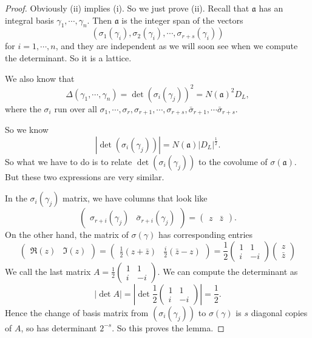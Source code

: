 \documentclass[a4paper]{article}
\begin{document}
\begin{proof}
  Obviously (ii) implies (i). So we just prove (ii). Recall that $\mathfrak{a}$ has an integral basis $\gamma_1, \cdots, \gamma_n$. Then $\mathfrak{a}$ is the integer span of the vectors
  \[
    (\sigma_1(\gamma_i), \sigma_2(\gamma_i), \cdots, \sigma_{r + s}(\gamma_i))
  \]
  for $i = 1, \cdots, n$, and they are independent as we will soon see when we compute the determinant. So it is a lattice.

  We also know that
  \[
    \Delta(\gamma_1, \cdots, \gamma_n) = \det (\sigma_i(\gamma_j))^2 = N(\mathfrak{a})^2 D_L,
  \]
  where the $\sigma_i$ run over all $\sigma_1, \cdots, \sigma_r, \sigma_{r + 1}, \cdots, \sigma_{r + s}, \bar{\sigma}_{r + 1}, \cdots \bar{\sigma}_{r + s}$.

  So we know
  \[
    |\det (\sigma_i(\gamma_j))| = N(\mathfrak{a}) |D_L|^{\frac{1}{2}}.
  \]
  So what we have to do is to relate $\det(\sigma_i(\gamma_j))$ to the covolume of $\sigma(\mathfrak{a})$. But these two expressions are very similar.

  In the $\sigma_i (\gamma_j)$ matrix, we have columns that look like
  \[
    \begin{pmatrix}
      \sigma_{r + i}(\gamma_j) & \bar{\sigma}_{r + i}(\gamma_j)
    \end{pmatrix} =
    \begin{pmatrix}
      z & \bar{z}
    \end{pmatrix}.
  \]
  On the other hand, the matrix of $\sigma(\gamma)$ has corresponding entries
  \[
    \begin{pmatrix}
      \Re(z) & \Im(z)
    \end{pmatrix} =
    \begin{pmatrix}
      \frac{1}{2}(z + \bar{z}) &\frac{i}{2}(\bar{z} - z)
    \end{pmatrix} =
    \frac{1}{2}
    \begin{pmatrix}
      1 & 1\\
      i & -i
    \end{pmatrix}
    \begin{pmatrix}
      z\\\bar{z}
    \end{pmatrix}
  \]
  We call the last matrix $A = \displaystyle\frac{1}{2}\begin{pmatrix}1 & 1\\i & -i\end{pmatrix}$. We can compute the determinant as
  \[
    |\det A| = \left|\det \frac{1}{2}
    \begin{pmatrix}
      1 & 1\\
      i & -i
    \end{pmatrix}\right| = \frac{1}{2}.
  \]
  Hence the change of basis matrix from $(\sigma_i(\gamma_j))$ to $\sigma(\gamma)$ is $s$ diagonal copies of $A$, so has determinant $2^{-s}$. So this proves the lemma.
\end{proof}
\end{document}
